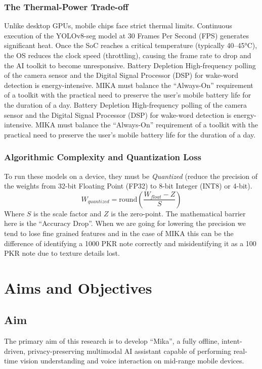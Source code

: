 \documentclass[12pt,a4paper]{report}
\begin{document}
\subsubsection{The Thermal-Power Trade-off}
Unlike desktop GPUs, mobile chips face strict thermal limits. Continuous execution of the YOLOv8-seg model at 30 Frames Per Second (FPS) generates significant heat. Once the SoC reaches a critical temperature (typically 40–45°C), the OS reduces the clock speed (throttling), causing the frame rate to drop and the AI toolkit to become unresponsive. Battery Depletion High-frequency polling of the camera sensor and the Digital Signal Processor (DSP) for wake-word detection is energy-intensive. MIKA must balance the ``Always-On'' requirement of a toolkit with the practical need to preserve the user's mobile battery life for the duration of a day. Battery Depletion High-frequency polling of the camera sensor and the Digital Signal Processor (DSP) for wake-word detection is energy-intensive. MIKA must balance the ``Always-On'' requirement of a toolkit with the practical need to preserve the user's mobile battery life for the duration of a day.
 
\subsubsection{Algorithmic Complexity and Quantization Loss}
To run these models on a device, they must be \textit{Quantized} (reduce the precision of the weights from 32-bit Floating Point (FP32) to 8-bit Integer (INT8) or 4-bit).
\begin{equation}
    W_{quantized} = \text{round} \left( \frac{W_{float} - Z}{S} \right)
\end{equation}
Where $S$ is the scale factor and $Z$ is the zero-point. The mathematical barrier here is the “Accuracy Drop”. When we are going for lowering the precision we tend to lose fine grained features and in the case of MIKA this can be the difference of identifying a 1000 PKR note correctly and misidentifying it as a 100 PKR note due to texture details lost.
 
\section{Aims and Objectives}
 
\subsection{Aim}
The primary aim of this research is to develop ``Mika'', a fully offline, intent-driven, privacy-preserving multimodal AI assistant capable of performing real-time vision understanding and voice interaction on mid-range mobile devices.
 
\end{document}
